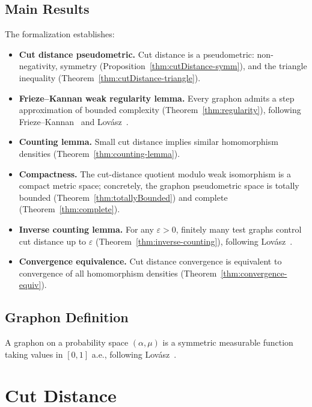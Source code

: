 \section{Main Results}

The formalization establishes:
\begin{itemize}
  \item \textbf{Cut distance pseudometric.}
    Cut distance is a pseudometric: non-negativity, symmetry
    (Proposition~\ref{thm:cutDistance-symm}), and the triangle inequality
    (Theorem~\ref{thm:cutDistance-triangle}).
  \item \textbf{Frieze--Kannan weak regularity lemma.}
    Every graphon admits a step approximation of bounded complexity
    (Theorem~\ref{thm:regularity}), following
    Frieze--Kannan~\cite{friezekannan1999} and
    Lov\'asz~\cite[Corollary~9.13]{lovasz2012}.
  \item \textbf{Counting lemma.}
    Small cut distance implies similar homomorphism densities
    (Theorem~\ref{thm:counting-lemma}).
  \item \textbf{Compactness.}
    The cut-distance quotient modulo weak isomorphism is a compact metric
    space; concretely, the graphon pseudometric space is totally bounded
    (Theorem~\ref{thm:totallyBounded}) and complete
    (Theorem~\ref{thm:complete}).
  \item \textbf{Inverse counting lemma.}
    For any $\varepsilon > 0$, finitely many test graphs control cut distance
    up to $\varepsilon$ (Theorem~\ref{thm:inverse-counting}),
    following Lov\'asz~\cite[Lemma~10.32]{lovasz2012}.
  \item \textbf{Convergence equivalence.}
    Cut distance convergence is equivalent to convergence of all
    homomorphism densities (Theorem~\ref{thm:convergence-equiv}).
\end{itemize}

\section{Graphon Definition}

A graphon on a probability space $(\alpha, \mu)$ is a symmetric measurable
function taking values in $[0,1]$ a.e., following
Lov\'asz~\cite[Definition~7.1]{lovasz2012}.



\chapter{Cut Distance}


